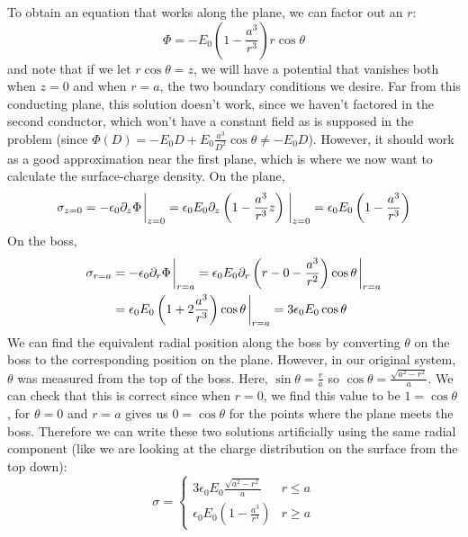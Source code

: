 \documentclass[a4paper,twoside]{article}
\begin{document}
\begin{itemize}
\begin{tcolorbox}[breakable]
    To obtain an equation that works along the plane, we can factor out an $r$:
    \begin{equation}
        \Phi = -E_0 \left( 1-\frac{a^3}{r^3} \right) r\cos\theta 
    \end{equation}
    and note that if we let $r\cos\theta = z$, we will have a potential that vanishes both when $z=0$ and when $r=a$, the two boundary conditions we desire. Far from this conducting plane, this solution doesn't work, since we haven't factored in the second conductor, which won't have a constant field as is supposed in the problem (since $\Phi(D) = -E_0 D + E_0 \frac{a^3}{D^2}\cos\theta\neq -E_0 D$). However, it should work as a good approximation near the first plane, which is where we now want to calculate the surface-charge density.
    On the plane,
    \begin{equation}
        \sigma_{z=0} = -\epsilon_0\partial_z\Phi\eval_{z=0} = \epsilon_0E_0\partial_z\left(1-\frac{a^3}{r^3}z \right)\eval_{z=0} = \epsilon_0 E_0 \left( 1-\frac{a^3}{r^3} \right)
    \end{equation}
    On the boss,
    \begin{align}
        \sigma_{r=a} &= -\epsilon_0\partial_r\Phi\eval_{r=a} = \epsilon_0E_0\partial_r\left(r-0-\frac{a^3}{r^2}  \right)\cos\theta\eval_{r=a}\nonumber\\
        &= \epsilon_0E_0\left(1+2 \frac{a^3}{r^3} \right)\cos\theta\eval_{r=a} = 3\epsilon_0E_0\cos\theta
    \end{align}
    We can find the equivalent radial position along the boss by converting $\theta$ on the boss to the corresponding position on the plane. However, in our original system, $\theta$ was measured from the top of the boss. Here, $\sin\theta = \frac{r}{a}$ so $\cos\theta = \frac{\sqrt{a^2-r^2}}{a}$. We can check that this is correct since when $r=0$, we find this value to be $1=\cos\theta$, for $\theta = 0$ and $r=a$ gives us $0=\cos\theta$ for the points where the plane meets the boss. Therefore we can write these two solutions artificially using the same radial component (like we are looking at the charge distribution on the surface from the top down):
    \begin{equation}
        \sigma=
        \begin{cases}
            3\epsilon_0E_0 \frac{\sqrt{a^2-r^2}}{a} & r \le  a\\
            \epsilon_0E_0\left( 1-\frac{a^3}{r^3} \right) & r \ge a
        \end{cases}
    \end{equation}

\end{tcolorbox}
\end{itemize}
\end{document}
